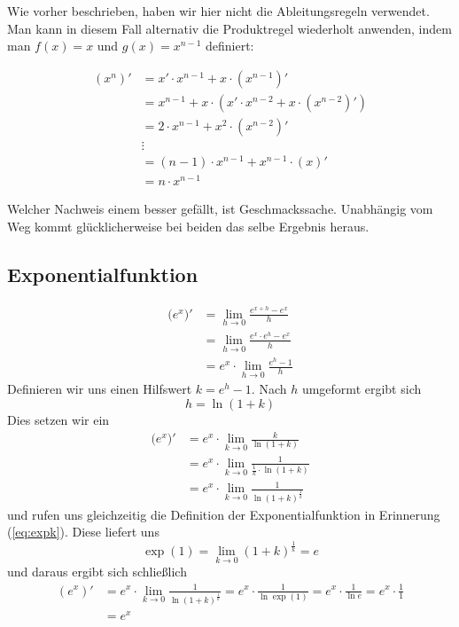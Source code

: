 Wie vorher beschrieben, haben wir hier nicht die Ableitungsregeln verwendet. Man kann in diesem Fall alternativ die Produktregel wiederholt anwenden, indem man $f(x)=x$ und $g(x) = x^{n-1}$ definiert:

\begin{equation}
\begin{split}
(x^n)' &= x' \cdot x^{n-1} + x \cdot (x^{n-1})' \\
&= x^{n-1}+x \cdot \left( x'\cdot x^{n-2} + x\cdot (x^{n-2})' \right) \\
&= 2\cdot x^{n-1} + x^2 \cdot (x^{n-2})' \\
&\vdots \\
&= (n-1)\cdot x^{n-1} + x^{n-1}\cdot (x)' \\
&= n\cdot x^{n-1}
\end{split}
\end{equation}

Welcher Nachweis einem besser gefällt, ist Geschmackssache. Unabhängig vom Weg kommt glücklicherweise bei beiden das selbe Ergebnis heraus. 

\subsection{Exponentialfunktion}\label{chap:diffexp}

\begin{equation}
\begin{split}
\big(e^x\big)' &= \lim_{h\rightarrow 0} \frac{e^{x+h}-e^x}{h} \\
&= \lim_{h\rightarrow 0} \frac{e^{x}\cdot e^{h}-e^x}{h} \\
&= e^x \cdot \lim_{h\rightarrow 0} \frac{e^{h}-1}{h}
\end{split}
\end{equation}
Definieren wir uns einen Hilfswert $k = e^h-1$. Nach $h$ umgeformt ergibt sich
\begin{equation}
h = \ln (1+k)
\end{equation}
Dies setzen wir ein
\begin{equation}
\begin{split}
\big(e^x\big)' &= e^x\cdot \lim_{k\rightarrow 0} \frac{k}{\ln (1+k)}\\
&= e^x\cdot \lim_{k\rightarrow 0} \frac{1}{\frac{1}{k}\cdot \ln (1+k)} \\
&= e^x\cdot \lim_{k\rightarrow 0} \frac{1}{\ln (1+k)^{\frac{1}{k}} }
\end{split}
\end{equation}
und rufen uns gleichzeitig die Definition der Exponentialfunktion in Erinnerung (\ref{eq:expk}). Diese liefert uns
\begin{equation}
\exp(1) = \lim_{k\rightarrow 0} (1+k)^{\frac{1}{k}} = e
\end{equation}
und daraus ergibt sich schließlich
\begin{equation}
\begin{split}
(e^x)' &= e^x\cdot \lim_{k\rightarrow 0} \frac{1}{\ln (1+k)^{\frac{1}{k}} }= e^x\cdot \frac{1}{\ln \exp(1) } = e^x\cdot \frac{1}{\ln e } = e^x\cdot \frac{1}{1}\\
&= e^x
\end{split}
\end{equation}

